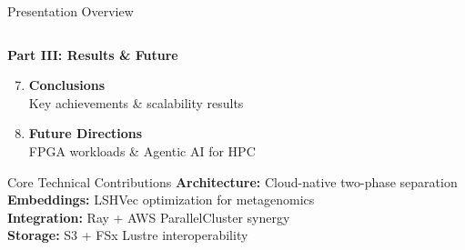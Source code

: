 \documentclass[aspectratio=169]{beamer}
\begin{document}
\begin{frame}{Presentation Overview}
\begin{columns}
\begin{column}{0.48\textwidth}
            \vspace{0.4cm}
            \textbf{\textcolor{awsorange}{Part III: Results \& Future}}
            \begin{enumerate}
                \setcounter{enumi}{6}
                \item \textbf{Conclusions} \\
                \small Key achievements \& scalability results
                
                \item \textbf{Future Directions} \\
                \small FPGA workloads \& Agentic AI for HPC
            \end{enumerate}
            
            \vspace{0.6cm}
            \begin{block}{Core Technical Contributions}
                \small
                \textbf{Architecture:} Cloud-native two-phase separation \\
                \textbf{Embeddings:} LSHVec optimization for metagenomics \\
                \textbf{Integration:} Ray + AWS ParallelCluster synergy \\
                \textbf{Storage:} S3 + FSx Lustre interoperability
            \end{block}
        \end{column}
    \end{columns}
\end{frame}
\end{document}
